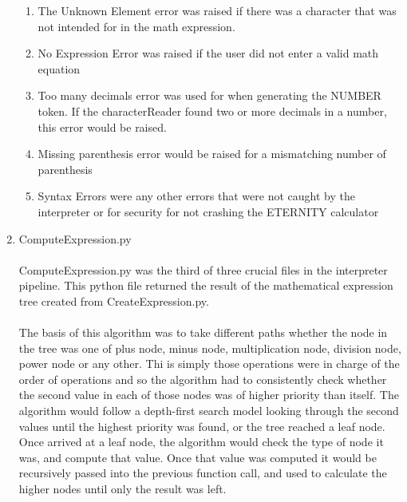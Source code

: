 \begin{enumerate}
            \begin{enumerate}
                \item The Unknown Element error was raised if there was a character that was not intended for in the math expression.
                \item No Expression Error was raised if the user did not enter a valid math equation
                \item Too many decimals error was used for when generating the NUMBER token. If the characterReader found two or more decimals in a number, this error would be raised.
                \item Missing parenthesis error would be raised for a mismatching number of parenthesis
                \item Syntax Errors were any other errors that were not caught by the interpreter or for security for not crashing the ETERNITY calculator
            \end{enumerate}

            \item ComputeExpression.py
            \paragraph{}
            ComputeExpression.py was the third of three crucial files in the interpreter pipeline. This python file returned the result of the mathematical expression tree created from CreateExpression.py.

            \paragraph{}
            The basis of this algorithm was to take different paths whether the node in the tree was one of  plus node, minus node, multiplication node, division node, power node or any other. Thi is simply those operations were in charge of the order of operations and so the algorithm had to consistently check whether the second value in each of those nodes was of higher priority than itself. The algorithm would follow a depth-first search model looking through the second values until the highest priority was found, or the tree reached a leaf node. Once arrived at a leaf node, the algorithm would check the type of node it was, and compute that value. Once that value was computed it would be recursively passed into the previous function call, and used to calculate the higher nodes until only the result was left.


\end{enumerate}
